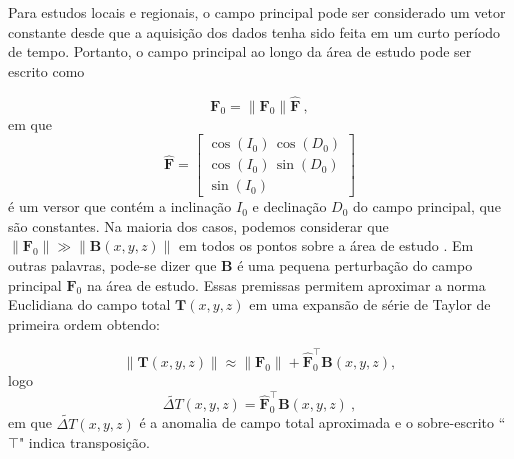 Para estudos locais e regionais, o campo principal pode ser considerado um vetor constante desde que a aquisição dos dados tenha sido feita em um curto período de tempo. Portanto, o campo principal ao longo da área de estudo pode ser escrito como

\begin{equation}
\mathbf{F}_{0} = \| \mathbf{F}_{0} \| \hat{\mathbf{F}} \: ,
\label{eq:geomagnetic_field_F0}
\end{equation}
em que
\begin{equation}
\hat{\mathbf{F}} = \left[
\begin{array}{c}
\cos(I_{0}) \, \cos(D_{0}) \\
\cos(I_{0}) \, \sin(D_{0}) \\
\sin(I_{0})
\end{array} \right]
\label{eq:unit_vector_F}
\end{equation}
é um versor que contém a inclinação $I_{0}$ e declinação $D_{0}$ do campo principal, que são constantes.
Na maioria dos casos, podemos considerar que $\|\mathbf{F}_0\| \gg \| \mathbf{B}(x, y, z) \|$ em todos os pontos sobre a área de estudo \citep{blakely1996}.
Em outras palavras, pode-se dizer que $\mathbf{B}$ é uma pequena perturbação do campo principal $\mathbf{F}_0$ na área de estudo. Essas premissas permitem aproximar a norma Euclidiana do campo total $\mathbf{T}(x, y, z)$ em uma expansão de série de Taylor de primeira ordem obtendo:

\begin{equation}\label{eq:taylorexp}
\|\mathbf{T}(x, y, z)\| \approx \|\mathbf{F}_0\| + \hat{\mathbf{F}}_0^{\top}\mathbf{B}(x, y, z) ,
\end{equation}
logo
\begin{equation}
\tilde{\Delta T}(x, y, z) = \hat{\mathbf{F}}^{\top}_0 \mathbf{B}(x, y, z) \: ,
\label{eq:tfanomaly}
\end{equation}
em que $ \tilde{\Delta T}(x, y, z) $ é a anomalia de campo total aproximada e o sobre-escrito ``$ \top $" indica transposição.

